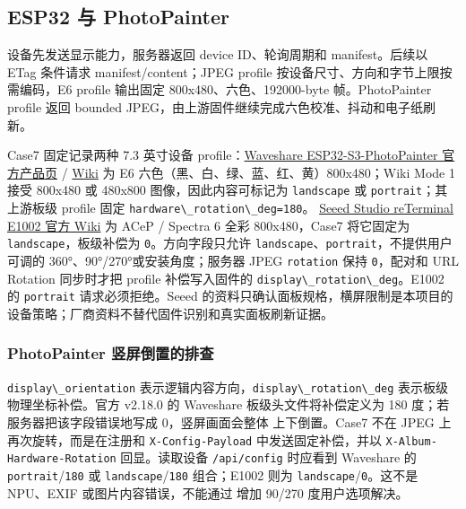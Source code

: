 \subsection{ESP32 与 PhotoPainter}\label{esp32-ux4e0e-photopainter}

设备先发送显示能力，服务器返回 device ID、轮询周期和 manifest。后续以
ETag 条件请求 manifest/content；JPEG profile
按设备尺寸、方向和字节上限按需编码，E6 profile 输出固定
800x480、六色、192000-byte 帧。PhotoPainter profile 返回 bounded
JPEG，由上游固件继续完成六色校准、抖动和电子纸刷新。

Case7 固定记录两种 7.3 英寸设备
profile：\href{https://www.waveshare.com/product/displays/e-paper/epaper-1/esp32-s3-photopainter.htm}{Waveshare
ESP32-S3-PhotoPainter 官方产品页} /
\href{https://www.waveshare.com/wiki/ESP32-S3-PhotoPainter}{Wiki} 为 E6
六色（黑、白、绿、蓝、红、黄）800x480；Wiki Mode 1 接受 800x480 或
480x800 图像，因此内容可标记为 \passthrough{\lstinline!landscape!} 或
\passthrough{\lstinline!portrait!}；其上游板级 profile 固定
\passthrough{\lstinline!hardware\_rotation\_deg=180!}。
\href{https://wiki.seeedstudio.com/getting_started_with_reterminal_e1002/}{Seeed
Studio reTerminal E1002 官方 Wiki} 为 ACeP / Spectra 6 全彩
800x480，Case7 将它固定为
\passthrough{\lstinline!landscape!}，板级补偿为
\passthrough{\lstinline!0!}。方向字段只允许
\passthrough{\lstinline!landscape!}、\passthrough{\lstinline!portrait!}，不提供用户可调的
360°、90°/270°或安装角度；服务器 JPEG \passthrough{\lstinline!rotation!}
保持 \passthrough{\lstinline!0!}，配对和 URL Rotation 同步时才把 profile
补偿写入固件的 \passthrough{\lstinline!display\_rotation\_deg!}。E1002
的 \passthrough{\lstinline!portrait!} 请求必须拒绝。Seeed
的资料只确认面板规格，横屏限制是本项目的设备策略；厂商资料不替代固件识别和真实面板刷新证据。

\subsubsection{PhotoPainter
竖屏倒置的排查}\label{photopainter-ux7ad6ux5c4fux5012ux7f6eux7684ux6392ux67e5}

\passthrough{\lstinline!display\_orientation!}
表示逻辑内容方向，\passthrough{\lstinline!display\_rotation\_deg!}
表示板级物理坐标补偿。官方 v2.18.0 的 Waveshare 板级头文件将补偿定义为
180 度；若服务器把该字段错误地写成 0，竖屏画面会整体 上下倒置。Case7
不在 JPEG 上再次旋转，而是在注册和
\passthrough{\lstinline!X-Config-Payload!} 中发送固定补偿，并以
\passthrough{\lstinline!X-Album-Hardware-Rotation!} 回显。读取设备
\passthrough{\lstinline!/api/config!} 时应看到 Waveshare 的
\passthrough{\lstinline!portrait!}/\passthrough{\lstinline!180!} 或
\passthrough{\lstinline!landscape!}/\passthrough{\lstinline!180!}
组合；E1002 则为
\passthrough{\lstinline!landscape!}/\passthrough{\lstinline!0!}。这不是
NPU、EXIF 或图片内容错误，不能通过 增加 90/270 度用户选项解决。

